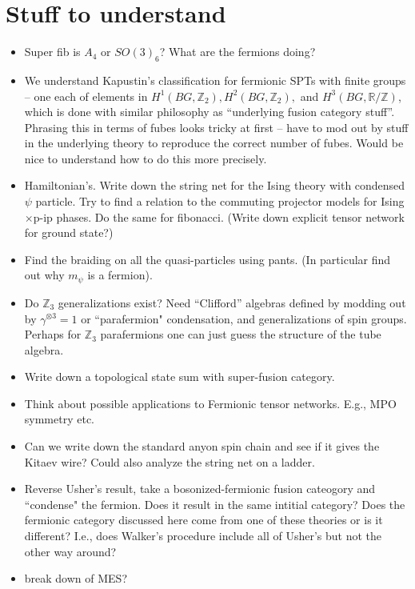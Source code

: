 \documentclass[12pt,a4paper]{article}
\newcommand{\tp}{\otimes}
\newcommand{\zz}{\mathbb{Z}}
\newcommand{\rr}{\mathbb{R}}
\newcommand{\zt}{\mathbb{Z}_2}
\begin{document}
{{\section{Stuff to understand}

\begin{itemize}
    \item Super fib is $A_4$ or $SO(3)_6$? What are the fermions doing?
    \item We understand Kapustin's classification for fermionic SPTs with finite groups -- one each of elements in $H^1(BG,\zt),H^2(BG,\zt),$ and $H^3(BG,\rr/\zz)$, which is done with similar philosophy as ``underlying fusion category stuff''. Phrasing this in terms of fubes looks tricky at first -- have to mod out by stuff in the underlying theory to reproduce the correct number of fubes. Would be nice to understand how to do this more precisely. 
    \item Hamiltonian's. Write down the string net for the Ising theory with condensed $\psi$ particle.
    Try to find a relation to the commuting projector models for Ising$\times$p-ip phases. 
    Do the same for fibonacci.
    (Write down explicit tensor network for ground state?)
    \item Find the braiding on all the quasi-particles using pants. (In particular find out why $m_\psi$ is a fermion). 
    \item Do $\mathbb{Z}_3$ generalizations exist? Need ``Clifford'' algebras defined by modding out by $\gamma^{\tp 3} = 1$ or ``parafermion" condensation, and generalizations of spin groups.
    Perhaps for $\mathbb{Z}_3$ parafermions one can just guess the structure of the tube algebra.
    \item Write down a topological state sum with super-fusion category. 
    \item Think about possible applications to Fermionic tensor networks. E.g., MPO symmetry etc. 
    \item Can we write down the standard anyon spin chain and see if it gives the Kitaev wire? Could also analyze the string net on a ladder. 
    \item Reverse Usher's result, take a bosonized-fermionic fusion cateogory and ``condense" the fermion. Does it result in the same intitial category? Does the fermionic category discussed here come from one of these theories or is it different? I.e., does Walker's procedure include all of Usher's but not the other way around?
    \item break down of MES?
\end{itemize}


}}
\end{document}
